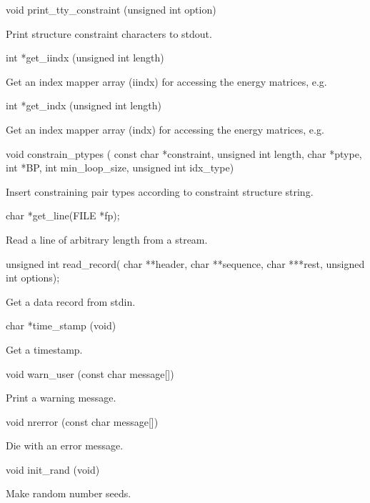 \begin{DoxyVerb}
void print_tty_constraint (unsigned int option)
\end{DoxyVerb}
 Print structure constraint characters to stdout. 

\begin{DoxyVerb}
int   *get_iindx (unsigned int length)
\end{DoxyVerb}
 Get an index mapper array (iindx) for accessing the energy matrices, e.g. 

\begin{DoxyVerb}
int   *get_indx (unsigned int length)
\end{DoxyVerb}
 Get an index mapper array (indx) for accessing the energy matrices, e.g. 

\begin{DoxyVerb}
void constrain_ptypes (
                const char *constraint,
                unsigned int length,
                char *ptype,
                int *BP,
                int min_loop_size,
                unsigned int idx_type)
\end{DoxyVerb}
 Insert constraining pair types according to constraint structure string. 

\begin{DoxyVerb}
char  *get_line(FILE *fp);
\end{DoxyVerb}
 Read a line of arbitrary length from a stream. 

\begin{DoxyVerb}
unsigned int read_record(
                char **header,
                char **sequence,
                char ***rest,
                unsigned int options);
\end{DoxyVerb}
 Get a data record from stdin. 

\begin{DoxyVerb}
char  *time_stamp (void)
\end{DoxyVerb}
 Get a timestamp. 

\begin{DoxyVerb}
void warn_user (const char message[])
\end{DoxyVerb}
 Print a warning message. 

\begin{DoxyVerb}
void nrerror (const char message[])
\end{DoxyVerb}
 Die with an error message. 

\begin{DoxyVerb}
void   init_rand (void)
\end{DoxyVerb}
 Make random number seeds. 

